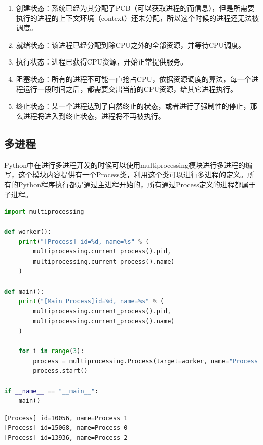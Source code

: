 \begin{enumerate}
    \item 创建状态：系统已经为其分配了PCB（可以获取进程的而信息），但是所需要执行的进程的上下文环境（context）还未分配，所以这个时候的进程还无法被调度。

    \item 就绪状态：该进程已经分配到除CPU之外的全部资源，并等待CPU调度。

    \item 执行状态：进程已获得CPU资源，开始正常提供服务。

    \item 阻塞状态：所有的进程不可能一直抢占CPU，依据资源调度的算法，每一个进程运行一段时间之后，都需要交出当前的CPU资源，给其它进程执行。

    \item 终止状态：某一个进程达到了自然终止的状态，或者进行了强制性的停止，那么进程将进入到终止状态，进程将不再被执行。
\end{enumerate}

\vspace{0.5cm}

\subsection{多进程}

Python中在进行多进程开发的时候可以使用multiprocessing模块进行多进程的编写，这个模块内容提供有一个Process类，利用这个类可以进行多进程的定义。所有的Python程序执行都是通过主进程开始的，所有通过Process定义的进程都属于子进程。\\


\begin{lstlisting}[language=Python]
import multiprocessing

def worker():
    print("[Process] id=%d, name=%s" % (
        multiprocessing.current_process().pid,
        multiprocessing.current_process().name)
    )

def main():
    print("[Main Process]id=%d, name=%s" % (
        multiprocessing.current_process().pid,
        multiprocessing.current_process().name)
    )
    
    for i in range(3):
        process = multiprocessing.Process(target=worker, name="Process %d" % i)
        process.start()

if __name__ == "__main__":
    main()
\end{lstlisting}

\begin{tcolorbox}
    \begin{verbatim}
[Process] id=10056, name=Process 1
[Process] id=15068, name=Process 0
[Process] id=13936, name=Process 2
	\end{verbatim}
\end{tcolorbox}

